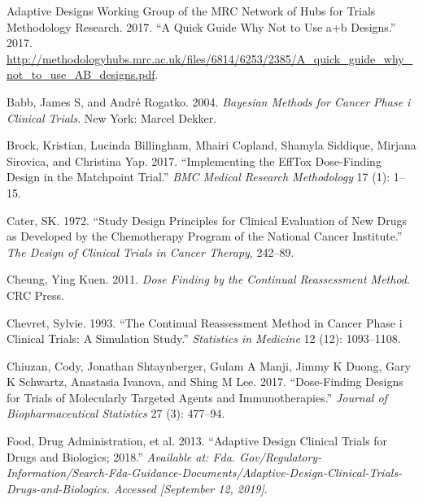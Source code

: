 \documentclass[
]{article}
\newlength{\cslhangindent}
\newlength{\cslentryspacingunit} %
\newenvironment{CSLReferences}[2] %
 {%
  \setlength{\parindent}{0pt}
  \ifodd #1
  \let\oldpar\par
  \def\par{\hangindent=\cslhangindent\oldpar}
  \fi
  \setlength{\parskip}{#2\cslentryspacingunit}
 }%
 {}
\begin{document}
\hypertarget{refs}{}
\begin{CSLReferences}{1}{0}
\leavevmode{}%
Adaptive Designs Working Group of the MRC Network of Hubs for Trials
Methodology Research. 2017. {``A Quick Guide Why Not to Use a+b
Designs.''} 2017.
\url{http://methodologyhubs.mrc.ac.uk/files/6814/6253/2385/A_quick_guide_why_not_to_use_AB_designs.pdf}.

\leavevmode{}%
Babb, James S, and André Rogatko. 2004. \emph{Bayesian Methods for
Cancer Phase i Clinical Trials}. New York: Marcel Dekker.

\leavevmode{}%
Brock, Kristian, Lucinda Billingham, Mhairi Copland, Shamyla Siddique,
Mirjana Sirovica, and Christina Yap. 2017. {``Implementing the EffTox
Dose-Finding Design in the Matchpoint Trial.''} \emph{BMC Medical
Research Methodology} 17 (1): 1--15.

\leavevmode{}%
Cater, SK. 1972. {``Study Design Principles for Clinical Evaluation of
New Drugs as Developed by the Chemotherapy Program of the National
Cancer Institute.''} \emph{The Design of Clinical Trials in Cancer
Therapy}, 242--89.

\leavevmode{}%
Cheung, Ying Kuen. 2011. \emph{Dose Finding by the Continual
Reassessment Method}. CRC Press.

\leavevmode{}%
Chevret, Sylvie. 1993. {``The Continual Reassessment Method in Cancer
Phase i Clinical Trials: A Simulation Study.''} \emph{Statistics in
Medicine} 12 (12): 1093--1108.

\leavevmode{}%
Chiuzan, Cody, Jonathan Shtaynberger, Gulam A Manji, Jimmy K Duong, Gary
K Schwartz, Anastasia Ivanova, and Shing M Lee. 2017. {``Dose-Finding
Designs for Trials of Molecularly Targeted Agents and
Immunotherapies.''} \emph{Journal of Biopharmaceutical Statistics} 27
(3): 477--94.

\leavevmode{}%
Food, Drug Administration, et al. 2013. {``Adaptive Design Clinical
Trials for Drugs and Biologics; 2018.''} \emph{Available at: Fda.
Gov/Regulatory-Information/Search-Fda-Guidance-Documents/Adaptive-Design-Clinical-Trials-Drugs-and-Biologics.
Accessed {[}September 12, 2019{]}}.


\end{CSLReferences}
\end{document}
